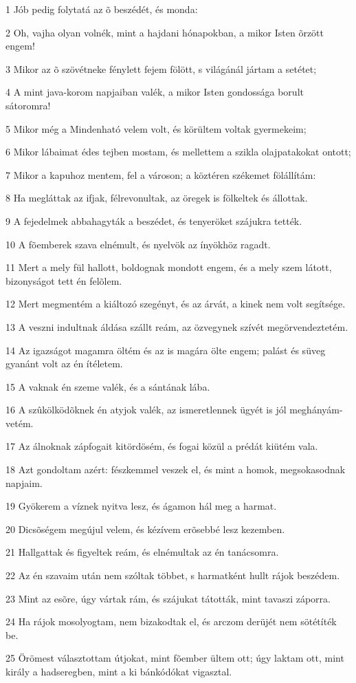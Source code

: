 \par 1 Jób pedig folytatá az õ beszédét, és monda:
\par 2 Oh, vajha olyan volnék, mint a hajdani hónapokban, a mikor Isten õrzött engem!
\par 3 Mikor az õ szövétneke fénylett fejem fölött, s világánál jártam a setétet;
\par 4 A mint java-korom napjaiban valék, a mikor Isten gondossága borult sátoromra!
\par 5 Mikor még a Mindenható velem volt, és körültem voltak gyermekeim;
\par 6 Mikor lábaimat édes tejben mostam, és mellettem a szikla olajpatakokat ontott;
\par 7 Mikor a kapuhoz mentem, fel a városon; a köztéren székemet fölállítám:
\par 8 Ha megláttak az ifjak, félrevonultak, az öregek is fölkeltek és állottak.
\par 9 A fejedelmek abbahagyták a beszédet, és tenyeröket szájukra tették.
\par 10 A fõemberek szava elnémult, és nyelvök az ínyökhöz ragadt.
\par 11 Mert a mely fül hallott, boldognak mondott engem, és a mely szem látott, bizonyságot tett én felõlem.
\par 12 Mert megmentém a kiáltozó szegényt, és az árvát, a kinek nem volt segítsége.
\par 13 A veszni indultnak áldása szállt reám, az özvegynek szívét megörvendeztetém.
\par 14 Az igazságot magamra öltém és az is magára ölte engem; palást és süveg gyanánt volt az én ítéletem.
\par 15 A vaknak én szeme valék, és a sántának lába.
\par 16 A szûkölködõknek én atyjok valék, az ismeretlennek ügyét is jól meghányám-vetém.
\par 17 Az álnoknak zápfogait kitördösém, és fogai közül a prédát kiütém vala.
\par 18 Azt gondoltam azért: fészkemmel veszek el, és mint a homok, megsokasodnak napjaim.
\par 19 Gyökerem a víznek nyitva lesz, és ágamon hál meg a harmat.
\par 20 Dicsõségem megújul velem, és kézívem erõsebbé lesz kezemben.
\par 21 Hallgattak és figyeltek reám, és elnémultak az én tanácsomra.
\par 22 Az én szavaim után nem szóltak többet, s harmatként hullt rájok beszédem.
\par 23 Mint az esõre, úgy vártak rám, és szájukat tátották, mint tavaszi záporra.
\par 24 Ha rájok mosolyogtam, nem bizakodtak el, és arczom derüjét nem sötétíték be.
\par 25 Örömest választottam útjokat, mint fõember ültem ott; úgy laktam ott, mint király a hadseregben, mint a ki bánkódókat vigasztal.

